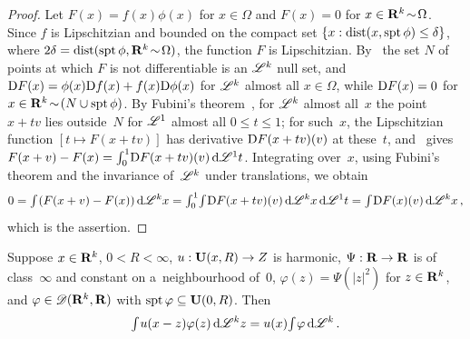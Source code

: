 \begin{proof}
    Let $F(x) = f(x) \phi(x)$ for $x \in \Omega$ and $F(x) = 0$ for $x \in \mathbf{R}^{k} \!\sim\!
    \Omega$. Since $f$ is Lipschitzian and bounded on the compact set $\{ x : \operatorname{dist}(x, \operatorname{spt} \phi)
    \le \delta \}$, where $2 \delta = \operatorname{dist}(\operatorname{spt} \phi, \mathbf{R}^{k} \!\sim\! \Omega)$, the function $F$
    is Lipschitzian. By~\cite[3.1.6]{Federer1969} the set $N$ of points at which $F$ is not
    differentiable is an $\mathscr{L}^{k}$ null set, and $\mathrm{D} F(x) = \phi(x) \mathrm{D} f(x) + f(x) \mathrm{D}
    \phi(x)$ for $\mathscr{L}^{k}$ almost all $x \in \Omega$, while $\mathrm{D} F(x) = 0$ for $x \in
    \mathbf{R}^{k} \!\sim\! (N \cup \operatorname{spt} \phi)$. By Fubini's theorem~\cite[2.6.2]{Federer1969}, for
    $\mathscr{L}^{k}$ almost all~$x$ the point $x + t v$ lies outside~$N$ for $\mathscr{L}^1$ almost all $0 \le t
    \le 1$; for such~$x$, the Lipschitzian function $[t \mapsto F(x + t v)]$ has derivative $\mathrm{D}
    F(x + t v)(v)$ at these~$t$, and~\cite[2.9.20]{Federer1969} gives $F(x + v) - F(x) =
    {\textstyle\int_{0}^{1}} \mathrm{D} F(x + t v)(v) \,\mathrm{d} \mathscr{L}^1 t$. Integrating over~$x$, using Fubini's theorem and
    the invariance of~$\mathscr{L}^{k}$ under translations, we obtain
    \begin{displaymath}
        0 = {\textstyle\int_{}^{}} (F(x + v) - F(x)) \,\mathrm{d} \mathscr{L}^{k} x = {\textstyle\int_{0}^{1}} {\textstyle\int_{}^{}} \mathrm{D} F(x +
        t v)(v) \,\mathrm{d} \mathscr{L}^{k} x \,\mathrm{d} \mathscr{L}^1 t = {\textstyle\int_{}^{}} \mathrm{D} F(x)(v) \,\mathrm{d} \mathscr{L}^{k} x \,,
    \end{displaymath}
    which is the assertion.
\end{proof}

\begin{lemma}[new]
    \label{new:meanvalue}
    Suppose $x \in \mathbf{R}^{k}$, $0 < R < \infty$, $u : \mathbf{U}(x,R) \to Z$ is harmonic, $\Psi : \mathbf{R}
    \to \mathbf{R}$ is of class~$\infty$ and constant on a~neighbourhood of~$0$, $\varphi(z) = \Psi(|z|^2)$
    for $z \in \mathbf{R}^{k}$, and $\varphi \in \mathscr{D}(\mathbf{R}^{k},\mathbf{R})$ with $\operatorname{spt} \varphi \subseteq
    \mathbf{U}(0,R)$. Then
    \begin{displaymath}
        {\textstyle\int_{}^{}} u(x - z) \varphi(z) \,\mathrm{d} \mathscr{L}^{k} z = u(x) {\textstyle\int_{}^{}} \varphi \,\mathrm{d}
        \mathscr{L}^{k} \,.
    \end{displaymath}
\end{lemma}

